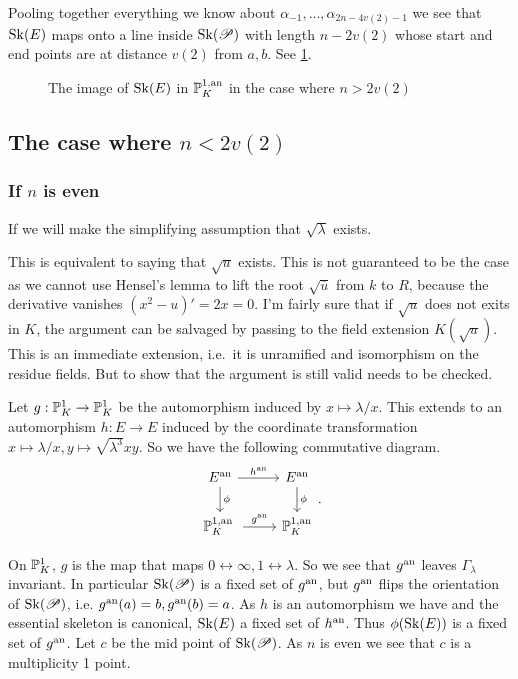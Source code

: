 Pooling together everything we know about $\alpha_{-1}, \ldots, \alpha_{2n - 4v(2)-1}$ we see that $\operatorname{Sk}(E)$ maps onto a line inside $\operatorname{Sk}(\mathscr P)$ with length $n- 2v(2)$ whose start and end points are at distance $v(2)$ from $a, b$.
See \cref{fig:image_between_skeleta_wild_ims}.
\begin{figure}[h]
    \centering
    \caption{The image of $\operatorname{Sk}(E)$ in  $\mathbb{P}^{1, \text{an}}_K$ in the case where $n > 2v(2)$}
    \label{fig:image_between_skeleta_wild_ims}
\end{figure}

\subsection{The case where $n < 2 v(2)$} \label{sec:the_case_where_n_<_2_v2}

\subsubsection{If $n$ is even} \label{sec:if_$n$_is_even}

If we will make the simplifying assumption that $\sqrt{\lambda} $ exists. 
\begin{remark}
	This is equivalent to saying that $\sqrt{u} $ exists.
	This is not guaranteed to be the case as we cannot use Hensel's lemma to lift the root $\sqrt{\overline{u}} $ from $k$ to $R$, because the derivative vanishes $(x^2 - u)' = 2x = 0$. 
	I'm fairly sure that if $\sqrt{u} $ does not exits in $ K$, the argument can be salvaged by passing to the field extension $K(\sqrt{u} )$. 
	This is an immediate extension, i.e.\ it is unramified and isomorphism on the residue fields. 
	But to show that the argument is still valid needs to be checked.
\end{remark}

Let $g: \mathbb{P}^{1}_K \to \mathbb{P}^{1}_K$ be the automorphism induced by $x \mapsto \lambda / x$. 
This extends to an automorphism $h: E \to E$ induced by the coordinate transformation $x \mapsto  \lambda / x, y\mapsto \sqrt{\lambda ^3} x y$. 
So we have the following commutative diagram.
\[
\begin{tikzcd}
	E\an \rar{h\an} \dar{\phi} & E\an \dar{\phi} \\
	\pro^{1, \text{an }}_K \rar{g\an} & \pro^{1, \text{an}}_K
\end{tikzcd}
.\] 

On $\mathbb{P}^{1}_K$, $g$ is the map that maps $0 \leftrightarrow \infty, 1 \leftrightarrow \lambda$. 
So we see that $g{}^{\text{an}}$ leaves $\Gamma_\lambda$ invariant. In particular $\operatorname{Sk}(\mathscr P)$ is a fixed set of $g{}^{\text{an}}$, but $g{}^{\text{an}}$ flips the orientation of $\operatorname{Sk}(\mathscr P)$, i.e. $g{}^{\text{an}}(a) = b, g{}^{\text{an}}(b) = a$. 
As $h$ is an automorphism we have and the essential skeleton is canonical, $\operatorname{Sk}(E)$ a fixed set of $h{}^{\text{an}}$. 
Thus $\phi(\sk(E))$ is a fixed set of $g{}^{\text{an}}$.
Let $c$ be the mid point of $\operatorname{Sk}(\mathscr P)$. 
As $n$ is even we see that $c$ is a multiplicity 1 point. 

